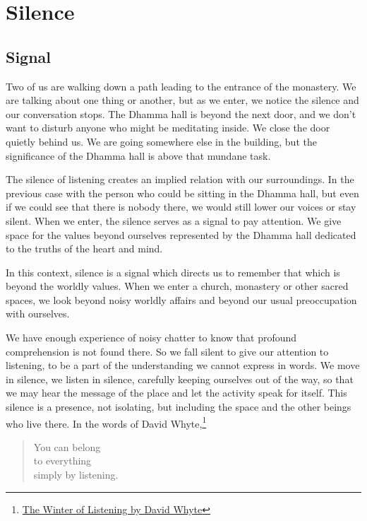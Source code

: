 \chapter{Silence}

\section{Signal}


Two of us are walking down a path leading to the entrance of the
monastery. We are talking about one thing or another, but as we enter,
we notice the silence and our conversation stops. The Dhamma hall is
beyond the next door, and we don't want to disturb anyone who might be
meditating inside. We close the door quietly behind us. We are going
somewhere else in the building, but the significance of the Dhamma hall
is above that mundane task.

The silence of listening creates an implied relation with our
surroundings. In the previous case with the person who could be sitting
in the Dhamma hall, but even if we could see that there is nobody there,
we would still lower our voices or stay silent. When we enter, the
silence serves as a signal to pay attention. We give space for the
values beyond ourselves represented by the Dhamma hall dedicated to the
truths of the heart and mind.

In this context, silence is a signal which directs us to remember that
which is beyond the worldly values. When we enter a church, monastery or
other sacred spaces, we look beyond noisy worldly affairs and beyond our
usual preoccupation with ourselves.

We have enough experience of noisy chatter to know that profound
comprehension is not found there. So we fall silent to give our
attention to listening, to be a part of the understanding we cannot
express in words. We move in silence, we listen in silence, carefully
keeping ourselves out of the way, so that we may hear the message of the
place and let the activity speak for itself. This silence is a presence,
not isolating, but including the space and the other beings who live
there. In the words of David Whyte,\footnote{\href{https://www.goodreads.com/quotes/10119971-the-winter-of-listening-no-one-but-me-by-the}{The
  Winter of Listening by David Whyte}}

\begin{quote}
You can belong\\
to everything\\
simply by listening.
\end{quote}

